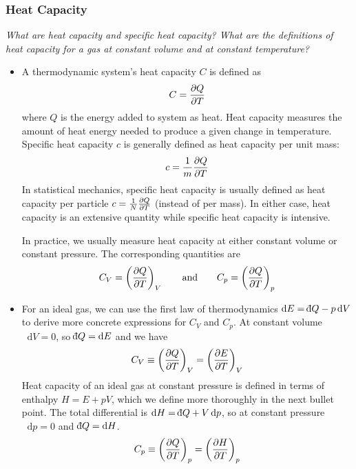 \documentclass[11pt, a4paper]{article}
\newcommand{\eqtext}[1]{\qquad \text{#1} \qquad}
\newcommand{\diff}{\mathop{}\!\mathrm{d}} %
\newcommand{\dbar}{{\mathchar '26\mkern -11mu \mathrm{d}}} %
\newcommand{\pdveval}[3]{\left(\pdv{#1}{#2}\right)_{#3}}
\begin{document}
\subsubsection{Heat Capacity}
\textit{What are heat capacity and specific heat capacity? What are the definitions of heat capacity for a gas at constant volume and at constant temperature?}
\begin{itemize}
	\item A thermodynamic system's heat capacity $ C $ is defined as
	\begin{equation*}
		C = \pdv{Q}{T}
	\end{equation*}
	where $ Q $ is the energy added to system as heat. Heat capacity measures the amount of heat energy needed to produce a given change in temperature. Specific heat capacity $ c $ is generally defined as heat capacity per unit mass:
	\begin{equation*}
		c = \frac{1}{m}\pdv{Q}{T}
	\end{equation*}
	In statistical mechanics, specific heat capacity is usually defined as heat capacity per particle $ c = \frac{1}{N}\pdv{Q}{T} $ (instead of per mass). In either case, heat capacity is an extensive quantity while specific heat capacity is intensive.
	
	In practice, we usually measure heat capacity at either constant volume or constant pressure. The corresponding quantities are
	\begin{equation*}
		C_{V} = \pdveval{Q}{T}{V} \eqtext{and} C_{p} = \pdveval{Q}{T}{p}
	\end{equation*}
	
	\item For an ideal gas, we can use the first law of thermodynamics $ \diff E = \dbar Q - p \diff V $ to derive more concrete expressions for $ C_{V} $ and $ C_{p} $. At constant volume $ \diff V = 0 $, so $ \dbar Q = \diff E $ and we have
	\begin{equation*}
		C_{V} \equiv \pdveval{Q}{T}{V} = \pdveval{E}{T}{V}
	\end{equation*}
	Heat capacity of an ideal gas at constant pressure is defined in terms of enthalpy $ H = E + pV $, which we define more thoroughly in the next bullet point. The total differential is $ \diff H = \dbar Q + V \diff p $, so at constant pressure $ \diff p = 0 $ and $ \dbar Q = \diff H $. 
	\begin{equation*}
		C_{p} \equiv \pdveval{Q}{T}{p} = \pdveval{H}{T}{p}
	\end{equation*}
	

\end{itemize}
\end{document}
